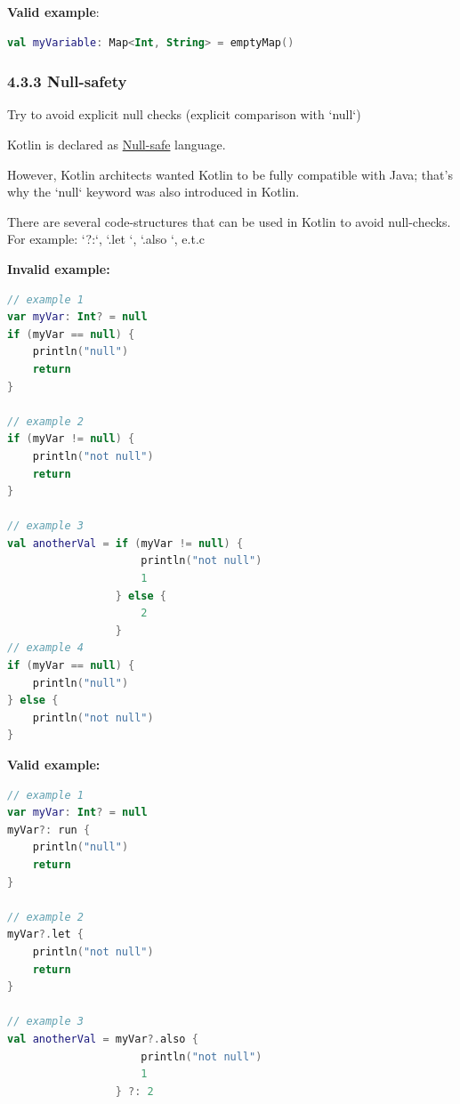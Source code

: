 {{{{\textbf{Valid example}:

\begin{lstlisting}[language=Kotlin]
val myVariable: Map<Int, String> = emptyMap() 
\end{lstlisting}


\subsubsection*{\textbf{4.3.3 Null-safety}}
\leavevmode\newline

\label{sec:4.3.3}



Try to avoid explicit null checks (explicit comparison with `null`) 

Kotlin is declared as \href{https://kotlinlang.org/docs/reference/null-safety.html}{Null-safe} language.

However, Kotlin architects wanted Kotlin to be fully compatible with Java; that's why the `null` keyword was also introduced in Kotlin. 



There are several code-structures that can be used in Kotlin to avoid null-checks. For example: `?:`,  `.let {}`, `.also {}`, e.t.c



\textbf{Invalid example:}

\begin{lstlisting}[language=Kotlin]
// example 1
var myVar: Int? = null
if (myVar == null) {
    println("null")
    return
}

// example 2
if (myVar != null) {
    println("not null")
    return
}

// example 3
val anotherVal = if (myVar != null) {
                     println("not null")
                     1
                 } else {
                     2
                 }
// example 4
if (myVar == null) {
    println("null")
} else {
    println("not null")
}
\end{lstlisting}


\textbf{Valid example:}

\begin{lstlisting}[language=Kotlin]
// example 1
var myVar: Int? = null
myVar?: run {
    println("null")
    return
}

// example 2
myVar?.let {
    println("not null")
    return
}

// example 3
val anotherVal = myVar?.also {
                     println("not null")
                     1
                 } ?: 2


\end{lstlisting}}}}}
